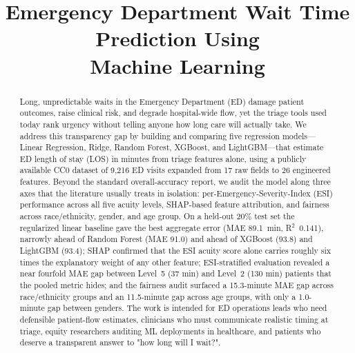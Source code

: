 \documentclass[conference]{IEEEtran}
\begin{document}
\title{Emergency Department Wait Time Prediction Using\\Machine Learning}

\author{
\and
{}
\and
{}
}

\maketitle

\begin{abstract}
Long, unpredictable waits in the Emergency Department (ED) damage patient
outcomes, raise clinical risk, and degrade hospital-wide flow, yet the triage
tools used today rank urgency without telling anyone how long care will
actually take. We address this transparency gap by building and comparing five
regression models---Linear Regression, Ridge, Random Forest, XGBoost, and
LightGBM---that estimate ED length of stay (LOS) in minutes from triage
features alone, using a publicly available CC0 dataset of 9{,}216 ED visits
expanded from 17 raw fields to 26 engineered features. Beyond the standard
overall-accuracy report, we audit the model along three axes that the
literature usually treats in isolation: per-Emergency-Severity-Index (ESI)
performance across all five acuity levels, SHAP-based feature attribution, and
fairness across race/ethnicity, gender, and age group. On a held-out 20\%
test set the regularized linear baseline gave the best aggregate error
(MAE 89.1~min, R$^2$~0.141), narrowly ahead of Random Forest (MAE 91.0) and
ahead of XGBoost (93.8) and LightGBM (93.4); SHAP confirmed that the ESI
acuity score alone carries roughly six times the explanatory weight of any
other feature; ESI-stratified evaluation revealed a near fourfold MAE gap
between Level~5 (37 min) and Level~2 (130 min) patients that the pooled metric
hides; and the fairness audit surfaced a 15.3-minute MAE gap across
race/ethnicity groups and an 11.5-minute gap across age groups, with only a
1.0-minute gap between genders. The work is intended for ED operations leads
who need defensible patient-flow estimates, clinicians who must communicate
realistic timing at triage, equity researchers auditing ML deployments in
healthcare, and patients who deserve a transparent answer to "how long will I
wait?".
\end{abstract}
\end{document}
